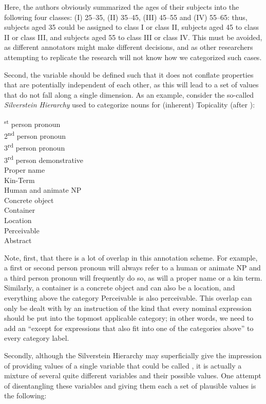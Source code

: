 Here, the authors obviously summarized the ages of their subjects into the following four classes: (I) 25--35, (II) 35--45, (III) 45--55 and (IV) 55--65: thus, subjects aged 35 could be assigned to class I or class II, subjects aged 45 to class II or class III, and subjects aged 55 to class III or class IV. This must be avoided, as different annotators might make different decisions, and as other researchers attempting to replicate the research will not know how we categorized such cases.

Second, the variable should be defined such that it does not conflate properties that are potentially independent of each other, as this will lead to a set of values that do not fall along a single dimension. As an example, consider the so-called \textit{Silverstein Hierarchy} used to categorize nouns for (inherent) Topicality (after \citealt[67]{deane_english_1987}): 

\begin{exe}
\textsuperscript{st} person pronoun\\
2\textsuperscript{nd} person pronoun\\
3\textsuperscript{rd} person pronoun\\
3\textsuperscript{rd} person demonstrative\\
Proper name\\
Kin-Term\\
Human and animate NP\\
Concrete object\\
Container\\
Location\\
Perceivable\\
Abstract
\label{ex:silverstein}
\end{exe}

Note, first, that there is a lot of overlap in this annotation scheme. For example, a first or second person pronoun will always refer to a human or animate NP and a third person pronoun will frequently do so, as will a proper name or a kin term. Similarly, a container is a concrete object and can also be a location, and everything above the category Perceivable is also perceivable. This overlap can only be dealt with by an instruction of the kind that every nominal expression should be put into the topmost applicable category; in other words, we need to add an ``except for expressions that also fit into one of the categories above'' to every category label.

Secondly, although the Silverstein Hierarchy may superficially give the impression of providing values of a single variable that could be called , it is actually a mixture of several quite different variables and their possible values. One attempt of disentangling these variables and giving them each a set of plausible values is the following:

